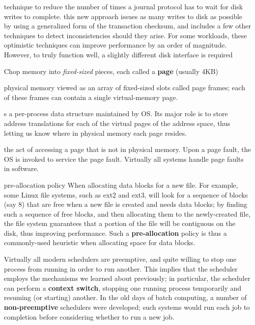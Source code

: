 \begin{description}
\item[optimistic crash consistency] technique to reduce the number of times a journal protocol has to wait for disk writes to complete.  this new approach issues as many writes to disk as possible by using a generalized form of the transaction checksum, and includes a few other techniques to detect inconsistencies should they arise. For some workloads, these optimistic techniques can improve performance by an order of magnitude. However, to truly function well, a slightly different disk interface is required

\item[paging] Chop memory into \emph{fixed-sized} pieces, each called a \textbf{page} (usually 4KB)

\item[page frame] physical memory viewed as an array of fixed-sized slots called page frames; each of these frames can contain a single virtual-memory page.

\item[page table] s a per-process data structure maintained by OS.  Its major role is to store address translations for each of the virtual pages of the address space, thus letting us know where in physical memory each page resides.

\item[page fault] the act of accessing a page that is not in physical memory.  Upon a page fault, the OS is invoked to service the page fault.  Virtually all systems handle page faults in software.

\item{pre-allocation policy} When allocating data blocks for a new file. For example, some Linux file systems, such as ext2 and ext3, will look for a sequence of blocks (say 8) that are free when a new file is created and needs data blocks; by finding such a sequence of free blocks, and then allocating them to the newly-created file, the file system guarantees that a portion of the file will be contiguous on the disk, thus improving performance. Such a \textbf{pre-allocation} policy is thus a commonly-used heuristic when allocating space for data blocks.

\item[preemptive scheduling] Virtually all modern schedulers are preemptive, and quite willing to stop one process from running in order to run another. This implies that the scheduler employs the mechanisms we learned about previously; in particular, the scheduler can perform a \textbf{context switch}, stopping one running process temporarily and resuming (or starting) another. In the old days of batch computing, a number of \textbf{non-preemptive} schedulers were developed; such systems would run each job to completion before considering whether to run a new job.


\end{description}
